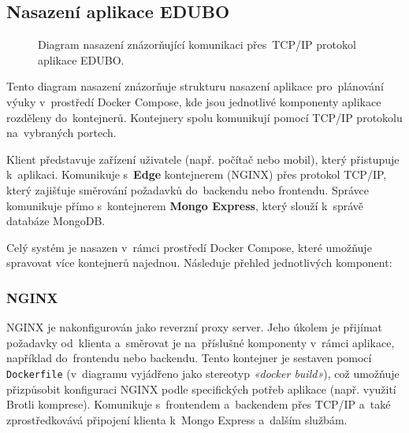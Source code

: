 \documentclass[male,czech,api_bc]{kitheses}
\begin{document}
\subsection{Nasazení aplikace EDUBO}

\begin{figure}[H]
	\centering
	\caption{Diagram nasazení znázorňující komunikaci přes~TCP/IP protokol aplikace EDUBO.}
	\label{fig:deployment-diagram-1}
\end{figure}

Tento diagram nasazení znázorňuje strukturu nasazení aplikace pro~plánování výuky v~prostředí Docker Compose, kde jsou jednotlivé komponenty aplikace rozděleny do~kontejnerů. Kontejnery spolu komunikují pomocí TCP/IP protokolu na~vybraných portech.

Klient představuje zařízení uživatele (např. počítač nebo mobil), který přistupuje k~aplikaci. Komunikuje s~\textbf{Edge} kontejnerem (NGINX) přes protokol TCP/IP, který zajišťuje směrování požadavků do~backendu nebo frontendu. Správce komunikuje přímo s~kontejnerem \textbf{Mongo Express}, který slouží k~správě databáze MongoDB.

Celý systém je nasazen v~rámci prostředí Docker Compose, které umožňuje spravovat více kontejnerů najednou. Následuje přehled jednotlivých komponent:

\subsubsection{NGINX}
NGINX je nakonfigurován jako reverzní proxy server. Jeho úkolem je přijímat požadavky od~klienta a~směrovat je na~příslušné komponenty v~rámci aplikace, například do~frontendu nebo backendu. Tento kontejner je sestaven pomocí \texttt{Dockerfile} (v~diagramu vyjádřeno jako stereotyp \textit{«docker build»}), což umožňuje přizpůsobit konfiguraci NGINX podle specifických potřeb aplikace (např. využití Brotli komprese). Komunikuje s~frontendem a~backendem přes TCP/IP a~také zprostředkovává připojení klienta k~Mongo Express a~dalším službám.
\end{document}
